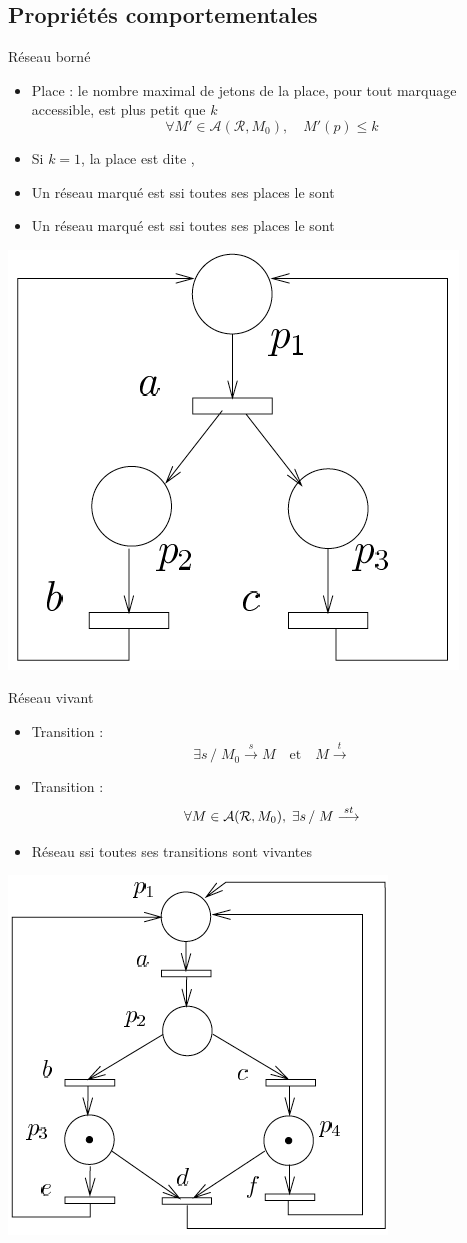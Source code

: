 \documentclass[compress]{beamer}
\begin{document}
\subsection{Propriétés comportementales}
\begin{frame}{Réseau borné}
\begin{itemize}
\item Place  : le nombre maximal de jetons de la place, pour tout marquage accessible, est plus petit que $k$
$$\forall M' \in \mathcal{A}(\mathcal{R}, M_0), \quad M'(p) \leq k$$
\item Si $k = 1$, la place est dite ,
\item Un réseau marqué est  ssi toutes ses places le sont
\item Un réseau marqué est  ssi toutes ses places le sont
\end{itemize}
\begin{center}
\includegraphics[width=.25\linewidth]{nonbor}
\end{center}
\end{frame}
 
\begin{frame}{Réseau vivant}
\begin{itemize}
\item Transition  : 
$$\exists s \, / \; M_0 \stackrel{s}{\longrightarrow} M \quad \mbox{et} \quad 
M \stackrel{t}{\longrightarrow}$$
\item Transition  :
$$\forall M \in {\cal A(R},M_0), \; \exists s \, / \; M \stackrel{st}{\longrightarrow}$$
\item Réseau  ssi toutes ses transitions sont vivantes
\end{itemize}
\begin{center}
\includegraphics[width=.35\linewidth]{qviva-n}
\end{center}
\end{frame}
  
\end{document}
